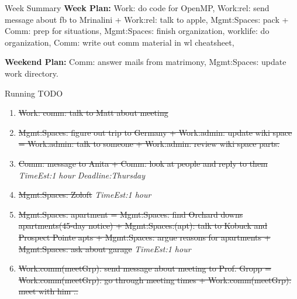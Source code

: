 \documentclass[serif, mathserif, final]{beamer}
\newcommand{\doneTask}[1]{\tiny \item \tiny \sout{#1}}
\newcommand{\te}[1]{\textit{TimeEst:}\textit{#1}}
\newcommand{\dl}[1]{\textit{Deadline:}\textit{#1}}
\newcommand{\comments}[1]{}
\begin{document}
\begin{frame}
\begin{columns}
    \begin{column}{0.50\linewidth}
      \begin{block}{Week Summary}
        {\tiny \textbf{Week Plan:} Work: do code for OpenMP, Work:rel:
          send message about fb to Mrinalini + Work:rel: talk to apple,
          Mgmt:Spaces: pack + Comm: prep for situations, Mgmt:Spaces:
          finish organization,  worklife: do organization, Comm: write
          out comm material in wl cheatsheet, } 

        {\tiny \textbf{Weekend Plan:} Comm: answer mails from
          matrimony, Mgmt:Spaces: update work directory.} 
      \end{block} 
      \begin{block}{Running TODO} %
        \begin{enumerate} 
          \doneTask{ Work: comm: talk to Matt about meeting} 
          \doneTask{ Mgmt:Spaces: figure out trip to Germany +
            Work:admin: update wiki space = Work:admin: talk to
            someone + Work:admin: review wiki space parts.} 
          \doneTask{ Comm: message to Anita +  Comm: look at people
            and reply to them } \te{1 hour} \dl{Thursday} 
          \doneTask{ Mgmt:Spaces: Zoloft} \te{1 hour}
        \doneTask{ Mgmt:Spaces: apartment = Mgmt:Spaces: find
          Orchard downs apartments(45-day notice) + Mgmt:Spaces:(apt):
          talk to Kobuck and Prospect Pointe apts + Mgmt:Spaces: argue
          reasons for apartments + Mgmt:Spaces: ask about garage} \te{1 hour} 
         \doneTask{Work:comm(meetGrp): send message about meeting to
          Prof. Gropp = Work:comm(meetGrp): go through meeting times +
          Work:comm(meetGrp): meet with him .. }

\comments{
        I've putting in theOpenMP shared memory into the XPACC code.

        Next week, I'llput in hybrid static/dynamic scheduling along
        with other OpenMP loop optimizations. 

        I'm putting aside the OpenACC code for right now.  
        General Goal: inform 
        Specific Goal: getting main work you wanted done done. (for
        OpenMP).  
        
        
        
}
\end{enumerate}
\end{block}
\end{column}
\end{columns}
\end{frame}
\end{document}
